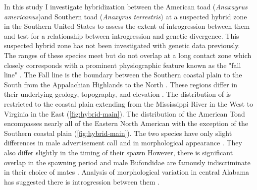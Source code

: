 In this study I investigate hybridization between the American toad 
(\textit{Anaxayrus americanus})and Southern toad (\textit{Anaxyrus terrestris}) 
at a suspected hybrid zone in the Southern United States to assess the extent of 
introgression between them and test for a relationship between introgression and 
genetic divergence. 
This suspected hybrid zone has not been investigated with genetic data previously. 
The ranges of these species meet but do not overlap at a long contact zone which
closely corresponds with a prominent physiographic feature known as the "fall line" \parencite{powell2016,mount1975}. 
The Fall line is the boundary between the Southern coastal plain to the South from 
the Appalachian Highlands to the North \parencite{shankman2007}.
These regions differ in their underlying geology, topography, and elevation \parencite{shankman2007}.
The distribution of \terr is restricted to the coastal plain extending from   
the Mississippi River in the West to Virginia in the East (\cref{fig:hybrid-main}).
The distribution of the American Toad encompasses nearly all of the Eastern North 
American with the exception of the Southern coastal plain (\cref{fig:hybrid-main}).
The two species have only slight differences in male advertisement call and in 
morphological appearance \parencite{cocroft1995,weatherby1982}. 
They also differ slightly in the timing of their spawn \parencite{mount1975} 
However, there is significant overlap in the spawning period and male Bufondidae 
are famously indiscriminate in their choice of mates \parencite{dordevic2014,weatherby1982}.
Analysis of morphological variation in central Alabama has suggested there is 
introgression between them \parencite{weatherby1982}.



